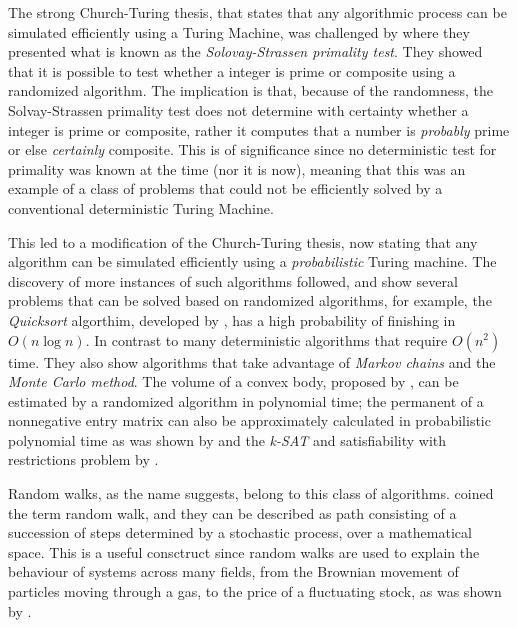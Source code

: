 \documentclass[../../dissertation.tex]{subfiles}
\begin{document}
The strong Church-Turing thesis, that states that any algorithmic process can be simulated efficiently using a Turing Machine, was challenged by \cite{solvaystrassen77} where they presented what is known as the \textit{Solovay-Strassen primality test}. They showed that it is possible to test whether a integer is prime or composite using a randomized algorithm. The implication is that, because of the randomness, the Solvay-Strassen primality test does not determine with certainty whether a integer is prime or composite, rather it computes that a number is \textit{probably} prime or else \textit{certainly} composite. This is of significance since no deterministic test for primality was known at the time (nor it is now), meaning that this was an example of a class of problems that could not be efficiently solved by a conventional deterministic Turing Machine.\par
This led to a modification of the Church-Turing thesis, now stating that any algorithm can be simulated efficiently using a \textit{probabilistic} Turing machine. The discovery of more instances of such algorithms followed,  \cite{motwani1995} and \cite{papadimitrious1994} show several problems that can be solved based on randomized algorithms, for example, the \textit{Quicksort} algorthim, developed by \cite{hoare61}, has a high probability of finishing in $O(n \log{n})$. In contrast to many deterministic algorithms that require $O(n^2)$ time. They also show algorithms that take advantage of \textit{Markov chains} and the \textit{Monte Carlo method}. The volume of a convex body, proposed by \cite{dyer1991}, can be estimated by a randomized algorithm in polynomial time; the permanent of a nonnegative entry matrix can also be approximately calculated in probabilistic polynomial time as was shown by \cite{jerrum2001} and the \textit{k-SAT} and satisfiability with restrictions problem by \cite{schoning1999}. \par
Random walks, as the name suggests, belong to this class of algorithms. \cite{kpearson1905} coined the term random walk, and they can be described as path consisting of a succession of steps determined by a stochastic process, over a mathematical space. This is a useful consctruct since random walks are used to explain the behaviour of systems across many fields, from the Brownian movement of particles moving through a gas, to the price of a fluctuating stock, as was shown by \cite{cootner67}.  
\end{document}
